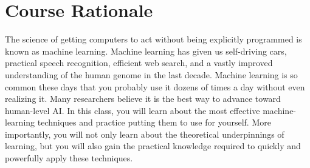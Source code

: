 \section{Course Rationale}
The science of getting computers to act without being explicitly programmed is known as machine learning. Machine learning has given us self-driving cars, practical speech recognition, efficient web search, and a vastly improved understanding of the human genome in the last decade. Machine learning is so common these days that you probably use it dozens of times a day without even realizing it. Many researchers believe it is the best way to advance toward human-level AI. In this class, you will learn about the most effective machine-learning techniques and practice putting them to use for yourself. More importantly, you will not only learn about the theoretical underpinnings of learning, but you will also gain the practical knowledge required to quickly and powerfully apply these techniques.
